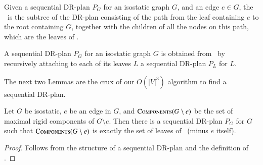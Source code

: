 \begin{definition}
[\Branch]
    Given a sequential DR-plan $P_G$ for an isostatic graph $G$, and an edge $e \in G$, the \branchGePG\ is the subtree of the DR-plan consisting of the path from the leaf containing $e$ to the root containing $G$, together with the children of all the nodes on this path, which are the leaves of \branchGePG.
\end{definition}

\begin{observation}
\label{obs:seqplan_rec_from_branches}
    A sequential DR-plan $P_G$ for an isostatic graph $G$ is obtained from \branchGePG\ by recursively attaching to each of its leaves $L$ a sequential DR-plan $P_L$ for $L$.
\end{observation}

The next two Lemmas are the crux of our $O(|V|^3)$ algorithm to find a sequential DR-plan.

\begin{lemma}
    Let $G$ be isostatic, $e$ be an edge in $G$, and $\textsc{Components}(G\setminus e)$ be the set of maximal rigid components of $G\setminus e$. Then there is a sequential DR-plan $P_G$ for $G$ such that $\textsc{Components}(G\setminus e)$ is exactly the set of leaves of \branchGePG\ (minus $e$ itself).
\end{lemma}

\begin{proof}
    Follows from the structure of a sequential DR-plan and the definition of \branchGePG.
\end{proof}



\ClearMyMinHeight
{}

